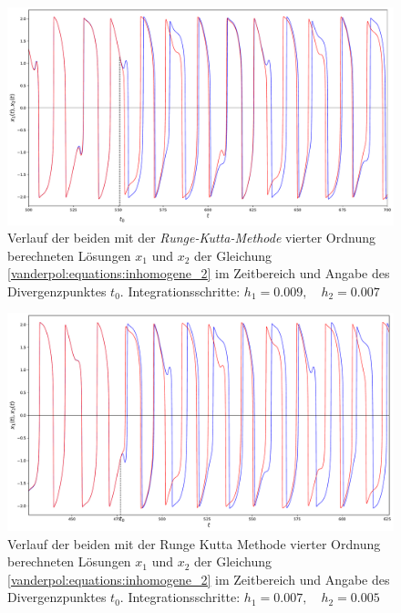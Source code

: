 \begin{figure}
\includegraphics[width=\textwidth]{papers/vanderpol/figures/RK_schritt_delta_2e-3_2.pdf}
\caption{Verlauf der beiden mit der {\em Runge-Kutta-Methode} vierter Ordnung berechneten Lösungen $x_1$ und $x_2$ der Gleichung \eqref{vanderpol:equations:inhomogene_2} im Zeitbereich und Angabe des Divergenzpunktes $t_0$. Integrationsschritte: $h_1 = 0.009, \quad h_2 = 0.007$\label{vanderpol:figures:RK_schritt_2e-3}}
\end{figure}

\begin{figure}
\includegraphics[width=\textwidth]{papers/vanderpol/figures/RK_schritt_delta_2e-3.pdf}
\caption{Verlauf der beiden mit der Runge Kutta Methode vierter Ordnung berechneten Lösungen $x_1$ und $x_2$ der Gleichung \eqref{vanderpol:equations:inhomogene_2} im Zeitbereich und Angabe des Divergenzpunktes $t_0$. Integrationsschritte: $h_1 = 0.007, \quad h_2 = 0.005$\label{vanderpol:figures:RK_schritt_2e-3_2}}
\end{figure}


